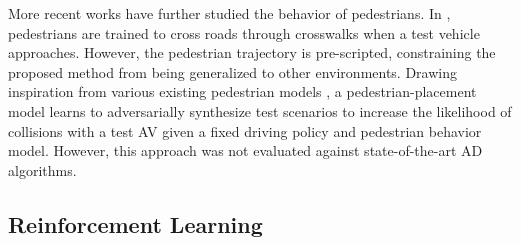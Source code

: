 \documentclass[letterpaper, 10 pt, conference]{ieeeconf}
\begin{document}
More recent works have further studied the behavior of pedestrians. In \cite{traffic_scenario_4}, pedestrians are trained to cross roads through crosswalks when a test vehicle approaches. However, the pedestrian trajectory is pre-scripted, constraining the proposed method from being generalized to other environments. Drawing inspiration from various existing pedestrian models \cite{pedestrian_model_1, traffic_scenario_simulation_6}, a pedestrian-placement model \cite{traffic_scenario_simulation_5} learns to adversarially synthesize test scenarios to increase the likelihood of collisions with a test AV given a fixed driving policy and pedestrian behavior model. However, this approach was not evaluated against state-of-the-art AD algorithms.



\subsection{Reinforcement Learning}
\end{document}

